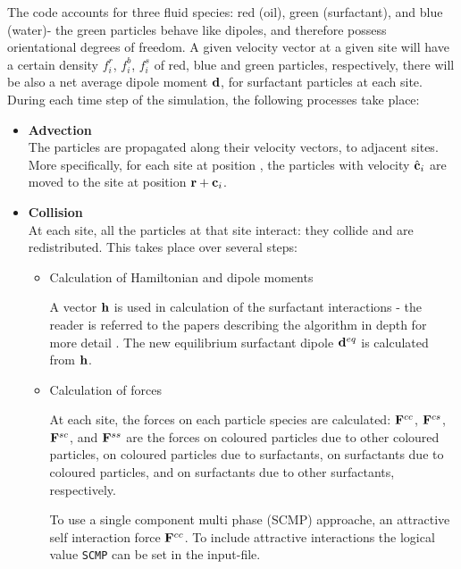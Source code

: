 \documentclass[a4paper]{article}
\begin{document}
The code accounts for three fluid species: red (oil), green
(surfactant), and blue (water)- the green particles behave like dipoles,
and therefore possess orientational degrees of freedom. 
A given velocity vector at a given site will have a certain density 
$f^r_i$, $f^b_i$, $f^s_i$ of red, blue and green particles,
respectively, there will be also a net average dipole moment ${\bf
d}$, for surfactant particles at each site.
During each time step of the simulation, the following processes take
place:

\begin{itemize}
\item{\bf Advection} \\
	The particles are propagated along their velocity vectors, to
	adjacent sites. More specifically, for each site at position
	, the particles with velocity $ \hat{\bf c }_i$ are moved to
	the site at position $ {\bf r } +  {\bf c }_i$. 

\item{\bf Collision} \\

	At each site, all the particles at that site interact: they
	collide and are redistributed. This takes place over several
	steps:

	\begin{itemize}
	\item{Calculation of Hamiltonian and dipole moments}

		A vector $ {\bf h }$ is used in calculation of the
		surfactant interactions - the reader is referred to the
		papers describing the algorithm in depth for more
		detail
		\cite{bib:maziar1}
		. The new equilibrium surfactant dipole
		$ {\bf d }^{eq}$ is calculated from $ {\bf h }$.
	
	\item{Calculation of forces}

		At each site, the forces on each particle species are
		calculated: $ {\bf F }^{cc}$, $ {\bf F }^{cs}$,
		$ {\bf F }^{sc}$, and $ {\bf F }^{ss}$ are the forces on
		coloured particles due to other coloured particles, on
		coloured particles due to surfactants, on surfactants
		due to coloured particles, and on surfactants due to
		other surfactants, respectively.

		To use a single component multi phase (SCMP) approache, an attractive self interaction force $ {\bf F }^{cc}$. To include attractive interactions the logical value
{\tt SCMP} can be set in the input-file.                


\end{itemize}
\end{itemize}
\end{document}
